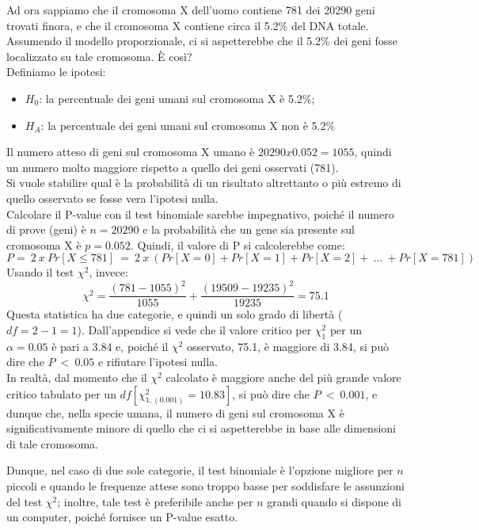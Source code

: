 \documentclass[10pt, draft]{book}
\newcommand{\tightlist}{%
\setlength{\itemsep}{1pt}\setlength{\parskip}{0pt}\setlength{\parsep}{0pt}}
\newcounter{example}[section]
\begin{document}
\begin{example}
    Ad ora sappiamo che il cromosoma X dell'uomo contiene 781 dei 20290 geni trovati finora, e che il cromosoma X contiene circa il 5.2\% del DNA totale.
    \\
    Assumendo il modello proporzionale, ci si aspetterebbe che il 5.2\% dei geni fosse localizzato su tale cromosoma. È così?
    \\
    Definiamo le ipotesi:
    \begin{itemize} \tightlist
        \item $H_0$: la percentuale dei geni umani sul cromosoma X è 5.2\%;
        \item $H_A$: la percentuale dei geni umani sul cromosoma X non è 5.2\%
    \end{itemize}
    Il numero atteso di geni sul cromosoma X umano è $20290 x 0.052 = 1055$, quindi un numero molto maggiore rispetto a quello dei geni osservati (781).
    \\
    Si vuole stabilire qual è la probabilità di un risultato altrettanto o più estremo di quello osservato se fosse vera l'ipotesi nulla.
    \\
    Calcolare il P-value con il test binomiale sarebbe impegnativo, poiché il numero di prove (geni) è $n = 20290$ e la probabilità che un gene sia presente sul cromosoma X  è $p = 0.052$. Quindi, il valore di P si calcolerebbe come:
    \begin{equation}
    P =\ 2\ x\ Pr[X\le781]\ =\ 2\ x\ (Pr[X=0] + Pr[X=1] + Pr[X = 2] +\ ...\ + Pr[X = 781])
    \end{equation}
    Usando il test $\chi^2$, invece:
    \begin{equation}
    \chi^2 = \frac{(781-1055)^2}{1055}+\frac{(19509-19235)^2}{19235} = 75.1
    \end{equation}
    Questa statistica ha due categorie, e quindi un solo grado di libertà ($df = 2-1 = 1$).
    Dall'appendice %
    si vede che il valore critico per $\chi^2_1$ per un $\alpha=0.05$ è pari a 3.84 e, poiché il $\chi^2$ osservato, 75.1, è maggiore di 3.84, si può dire che $P\ <\ 0.05$ e rifiutare l'ipotesi nulla.
    \\
    In realtà, dal momento che il $\chi^2$ calcolato è maggiore anche del più grande valore critico tabulato per un $df[\chi^2_{1,(0.001)} = 10.83]$, si può dire che $P\ <\ 0.001$, e dunque che, nella specie umana, il numero di geni sul cromosoma X è significativamente minore di quello che ci si aspetterebbe in base alle dimensioni di tale cromosoma.
\end{example}
Dunque, nel caso di due sole categorie, il test binomiale è l'opzione migliore per $n$ piccoli e quando le frequenze attese sono troppo basse per soddisfare le assunzioni del test $\chi^2$; inoltre, tale test è preferibile anche per $n$ grandi quando si dispone di un computer, poiché fornisce un P-value esatto.
\end{document}
